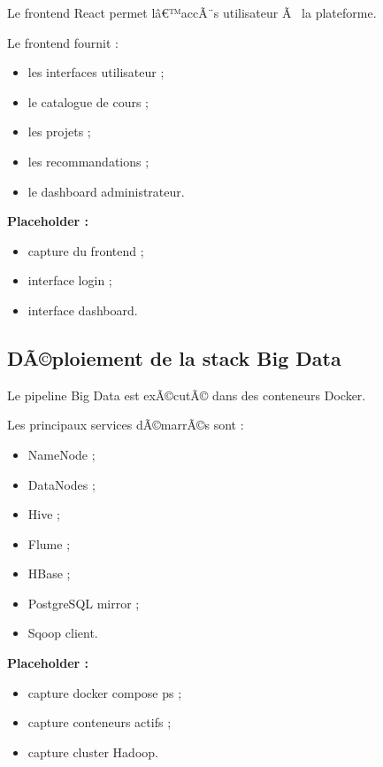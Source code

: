 ﻿\documentclass[12pt,a4paper]{report}
\begin{document}
Le frontend React permet lâ€™accÃ¨s utilisateur Ã  la plateforme.

Le frontend fournit :
\begin{itemize}
    \item les interfaces utilisateur ;
    \item le catalogue de cours ;
    \item les projets ;
    \item les recommandations ;
    \item le dashboard administrateur.
\end{itemize}

\vspace{0.3cm}

\textbf{Placeholder :}
\begin{itemize}
    \item capture du frontend ;
    \item interface login ;
    \item interface dashboard.
\end{itemize}

\subsection{DÃ©ploiement de la stack Big Data}

Le pipeline Big Data est exÃ©cutÃ© dans des conteneurs Docker.

Les principaux services dÃ©marrÃ©s sont :
\begin{itemize}
    \item NameNode ;
    \item DataNodes ;
    \item Hive ;
    \item Flume ;
    \item HBase ;
    \item PostgreSQL mirror ;
    \item Sqoop client.
\end{itemize}

\vspace{0.3cm}

\textbf{Placeholder :}
\begin{itemize}
    \item capture docker compose ps ;
    \item capture conteneurs actifs ;
    \item capture cluster Hadoop.
\end{itemize}
\end{document}

